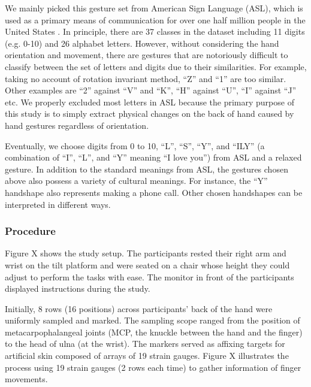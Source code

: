 \documentclass{sigchi}
\begin{document}
We mainly picked this gesture set from American Sign Language (ASL), which is used as a primary means of communication for over one half million people in the United States \cite{How_Many_People_Use_ASL}. 
In principle, there are 37 classes in the dataset including 11 digits (e.g. 0-10) and 26 alphabet letters. However, without considering the hand orientation and movement, there are gestures that are notoriously difficult to classify between the set of letters and digits due to their similarities.
For example, taking no account of rotation invariant method, ``Z'' and ``1'' are too similar.
Other examples are ``2'' against ``V'' and ``K'', ``H'' against ``U'', ``I'' against ``J'' etc.
We properly excluded most letters in ASL because the primary purpose of this study is to simply extract physical changes on the back of hand caused by hand gestures regardless of orientation.

Eventually, we choose digits from 0 to 10, ``L'', ``S'', ``Y'', and ``ILY'' (a combination of ``I'', ``L'', and ``Y'' meaning ``I love you'') from ASL and a relaxed gesture. In addition to the standard meanings from ASL, the gestures chosen above also possess a variety of cultural meanings. For instance, the ``Y'' handshape also represents making a phone call. Other chosen handshapes can be interpreted in different ways.


\subsubsection{Procedure}
Figure X shows the study setup. The participants rested their right arm and wrist on the tilt platform and were seated on a chair whose height they could adjust to perform the tasks with ease. The monitor in front of the participants displayed instructions during the study.

Initially, 8 rows (16 positions) across participants’ back of the hand were uniformly sampled and marked. The sampling scope ranged from the position of metacarpophalangeal joints (MCP, the knuckle between the hand and the finger) to the head of ulna (at the wrist).%
 The markers served as affixing targets for artificial skin composed of arrays of 19 strain gauges. 
Figure X illustrates the process using 19 strain gauges (2 rows each time) to gather information of finger movements.
\end{document}
